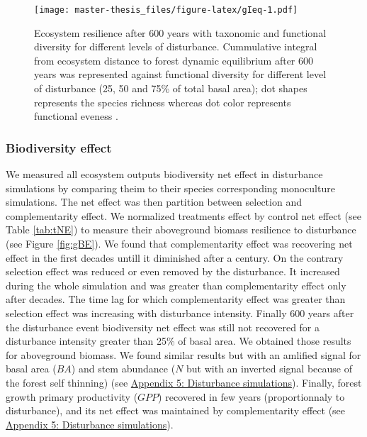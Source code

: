 \documentclass[12pt,]{article}
\theoremstyle{definition}
\theoremstyle{definition}
\theoremstyle{remark}
\begin{document}
\begin{figure}[htbp]
\centering
\texttt{[image: master-thesis\_files/figure-latex/gIeq-1.pdf]}
\caption{\label{fig:gIeq}Ecosystem resilience after 600 years with taxonomic
and functional diversity for different levels of disturbance.
Cummulative integral from ecosystem distance to forest dynamic
equilibrium after 600 years was represented against functional diversity
\citep[FDiv,][]{villeger_new_2008} for different level of disturbance
(25, 50 and 75\% of total basal area); dot shapes represents the species
richness whereas dot color represents functional eveness
\citep[FEve,][]{villeger_new_2008}.}
\end{figure}

\subsubsection{Biodiversity effect}\label{biodiversity-effect-1}

We measured all ecosystem outputs biodiversity net effect in disturbance
simulations by comparing theim to their species corresponding
monoculture simulations. The net effect was then partition between
selection and complementarity effect. We normalized treatments effect by
control net effect (see Table \ref{tab:tNE}) to measure their
aboveground biomass resilience to disturbance (see Figure
\ref{fig:gBE}). We found that complementarity effect was recovering net
effect in the first decades untill it diminished after a century. On the
contrary selection effect was reduced or even removed by the
disturbance. It increased during the whole simulation and was greater
than complementarity effect only after decades. The time lag for which
complementarity effect was greater than selection effect was increasing
with disturbance intensity. Finally 600 years after the disturbance
event biodiversity net effect was still not recovered for a disturbance
intensity greater than 25\% of basal area. We obtained those results for
aboveground biomass. We found similar results but with an amlified
signal for basal area (\(BA\)) and stem abundance (\(N\) but with an
inverted signal because of the forest self thinning) (see
\protect\hyperlink{appendix-5-disturbance-simulations}{Appendix 5:
Disturbance simulations}). Finally, forest growth primary productivity
(\(GPP\)) recovered in few years (proportionnaly to disturbance), and
its net effect was maintained by complementarity effect (see
\protect\hyperlink{appendix-5-disturbance-simulations}{Appendix 5:
Disturbance simulations}).
\end{document}
